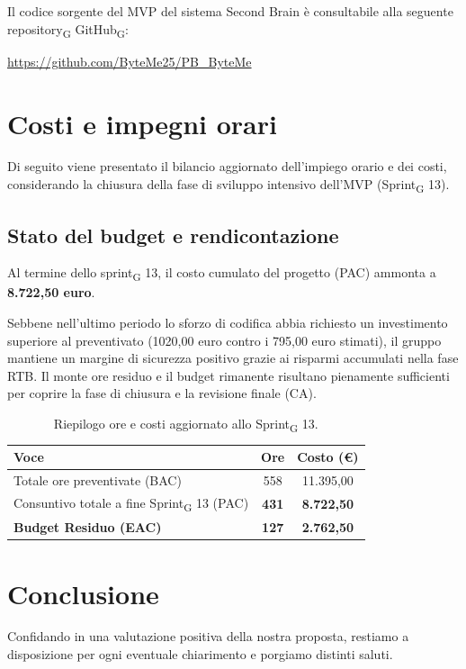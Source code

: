 \documentclass[11pt,a4paper]{article}
\newcommand{\gls}[1]{#1\textsubscript{G}}
\begin{document}
Il codice sorgente del MVP del sistema Second Brain è consultabile alla seguente \gls{repository} \gls{GitHub}:
\begin{center}
 \url{https://github.com/ByteMe25/PB_ByteMe}
\end{center}

\newpage
\section{Costi e impegni orari}
Di seguito viene presentato il bilancio aggiornato dell'impiego orario e dei costi, considerando la chiusura della fase di sviluppo intensivo dell'MVP (\gls{Sprint} 13).

\subsection*{Stato del budget e rendicontazione}
Al termine dello \gls{sprint} 13, il costo cumulato del progetto (PAC) ammonta a \textbf{8.722,50 euro}. 

Sebbene nell'ultimo periodo lo sforzo di codifica abbia richiesto un investimento superiore al preventivato (1020,00 euro contro i 795,00 euro stimati), il gruppo mantiene un margine di sicurezza positivo grazie ai risparmi accumulati nella fase RTB. Il monte ore residuo e il budget rimanente risultano pienamente sufficienti per coprire la fase di chiusura e la revisione finale (CA).

\begin{table}[H]
    \centering
    \renewcommand{\arraystretch}{1.3}
    \begin{tabular}{|l|c|c|}
        \hline
        \textbf{Voce} & \textbf{Ore} & \textbf{Costo (€)} \\
        \hline
        Totale ore preventivate (BAC) & 558 & 11.395,00 \\
        Consuntivo totale a fine \gls{Sprint} 13 (PAC) & \textbf{431} & \textbf{8.722,50} \\
        \hline
        \textbf{Budget Residuo (EAC)} & \textbf{127} & \textbf{2.762,50} \\
        \hline
    \end{tabular}
    \vspace{0.2cm}
    \caption{Riepilogo ore e costi aggiornato allo \gls{Sprint} 13.}
\end{table}


\newpage
\section{Conclusione}
Confidando in una valutazione positiva della nostra proposta, restiamo a disposizione per ogni eventuale chiarimento e porgiamo distinti saluti.
\end{document}
